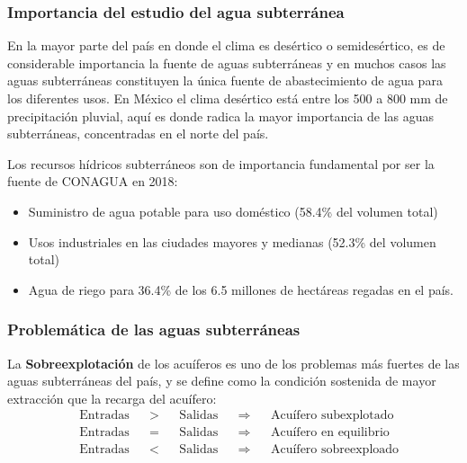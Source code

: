 \subsubsection{Importancia del estudio del agua subterránea}
En la mayor parte del país en donde el clima es desértico o semidesértico, es de considerable importancia la fuente de aguas subterráneas y en muchos casos las aguas subterráneas constituyen la única fuente de abastecimiento de agua para los diferentes usos.
En México el clima desértico está entre los 500 a 800 mm de precipitación pluvial, aquí es donde radica la mayor importancia de las aguas subterráneas, concentradas en el norte del país.

Los recursos hídricos subterráneos son de importancia fundamental por ser la fuente de CONAGUA en 2018:
\begin{itemize}
    \item Suministro de agua potable para uso doméstico (58.4\% del volumen total)
    \item Usos industriales en las ciudades mayores y medianas (52.3\% del volumen total)
    \item Agua de riego para 36.4\% de los 6.5 millones de hectáreas regadas en el país.
\end{itemize}
\subsubsection{Problemática de las aguas subterráneas}
La \textbf{Sobreexplotación} de los acuíferos es uno de los problemas más fuertes de las aguas subterráneas del país, y se define como la condición sostenida de mayor extracción que la recarga del acuífero:
\begin{align*}
    &\text{Entradas}&&>&&\text{Salidas}&&\Longrightarrow&&\text{Acuífero subexplotado}\\
    &\text{Entradas}&&=&&\text{Salidas}&&\Longrightarrow&&\text{Acuífero en equilibrio}\\
    &\text{Entradas}&&<&&\text{Salidas}&&\Longrightarrow&&\text{Acuífero sobreexploado}
\end{align*}
